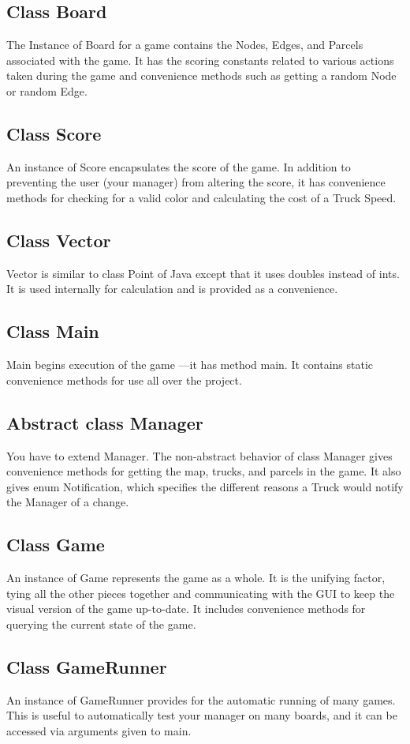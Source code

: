 \documentclass[11pt]{article}
\begin{document}
\subsection{Class Board}
The Instance of Board for a game contains the Nodes, Edges, and Parcels associated with the game. It has the scoring constants related to various actions taken during the game and convenience methods such as getting a random Node or random Edge.
\subsection{Class Score}
An instance of Score encapsulates the score of the game. In addition to preventing the user (your manager) from altering the score, it has convenience methods for checking for a valid color and calculating the cost of a Truck Speed.
\subsection{Class Vector}
Vector is  similar to class Point of Java except that it uses doubles instead of ints. It is used internally for calculation and is provided as a convenience.
\subsection{Class Main}
Main begins execution of the game —it has method main. It contains static convenience methods for use all over the project.
\subsection{Abstract class Manager}
You have to extend Manager. The non-abstract behavior of class Manager gives convenience methods for getting the map, trucks, and parcels in the game. It also gives enum Notification, which specifies the different reasons a Truck would notify the Manager of a change.
\subsection{Class Game}
An instance of Game represents the game as a whole. It is the unifying factor, tying all  the other pieces together and communicating with the GUI to keep the visual version of the game up-to-date. It includes convenience methods for querying the current state of the game.
\subsection{Class GameRunner}
An instance of GameRunner provides for the automatic running of many games. This is useful to automatically test your manager on many boards, and it can be accessed via arguments given to main.
\end{document}
